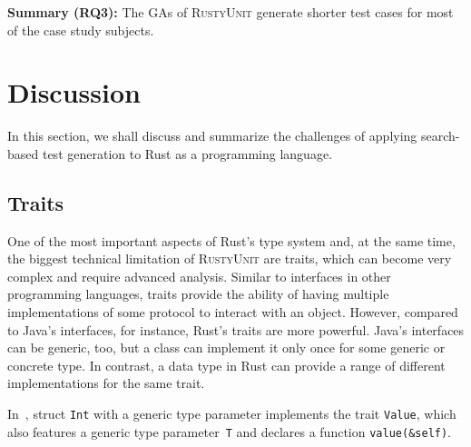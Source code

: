 \documentclass[paper=a4,%
  twoside,%
  BCOR4mm,%
  abstract=true,%
  toc=bibliography,%
  chapterprefix=true,%
  toc=bibliographynumbered,%
  open=right,%
  english,%
  pagesize=pdftex]{scrreprt}
\newcommand{\tech}{\textsc{RustyUnit}\xspace}
\newcommand{\todo}[1]{\textbf{TODO: #1}}
\begin{document}
\noindent\begin{tcolorbox}
\textbf{Summary (RQ3):} The \acp{GA} of \tech generate shorter test cases for most of the case study subjects.
\end{tcolorbox}



\section{Discussion}
\label{sec:discussion}
In this section, we shall discuss and summarize the challenges of applying search-based test generation to Rust as a programming language.

\subsection*{Traits}
One of the most important aspects of Rust's type system and, at the same time, the biggest technical limitation of \tech are traits, which can become very complex and require advanced analysis. Similar to interfaces in other programming languages, traits provide the ability of having multiple implementations of some protocol to interact with an object. However, compared to Java's interfaces, for instance, Rust's traits are more powerful. Java's interfaces can be generic, too, but a class can implement it only once for some generic or concrete type. In contrast, a data type in Rust can provide a range of different implementations for the same trait.

In~, struct \texttt{Int} with a generic type parameter implements the trait \texttt{Value}, which also features a generic type parameter~\texttt{T} and declares a function \texttt{value(\&self)}.
\end{document}
